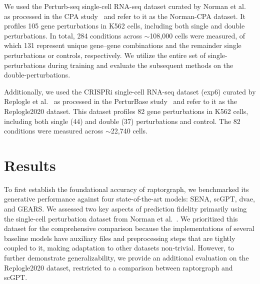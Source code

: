 \documentclass[10pt,letterpaper]{article}
\theoremstyle{definition}
\theoremstyle{remark}
\begin{document}
We used the Perturb-seq single-cell RNA-seq dataset curated by Norman et al.~\cite{norman2019exploring} as processed in the CPA study~\cite{lotfollahi_predicting_2023} and refer to it as the Norman-CPA dataset.
It profiles 105 gene perturbations in K562 cells, including both single and double perturbations.
In total, 284 conditions across $\sim$108{,}000 cells were measured, of which 131 represent unique gene--gene combinations and the remainder single perturbations or controls, respectively.
We utilize the entire set of single-perturbations during training and evaluate the subsequent methods on the double-perturbations.

Additionally, we used the CRISPRi single-cell RNA-seq dataset (exp6) curated by Replogle et al.~\cite{replogle_combinatorial_2020} as processed in the PerturBase study~\cite{wei_perturbase_2024} and refer to it as the Replogle2020 dataset.
This dataset profiles 82 gene perturbations in K562 cells, including both single (44) and double (37) perturbations and control.
The 82 conditions were measured across $\sim$22{,}740 cells.




\section*{Results}
To first establish the foundational accuracy of \gls{raptorgraph}, we benchmarked its generative performance against four state-of-the-art models: SENA, scGPT, \gls{dvae}, and GEARS.
We assessed two key aspects of prediction fidelity primarily using the single-cell perturbation dataset from Norman et al.~\cite{norman2019exploring}.
We prioritized this dataset for the comprehensive comparison because the implementations of several baseline models have auxiliary files and preprocessing steps that are tightly coupled to it, making adaptation to other datasets non-trivial.
However, to further demonstrate generalizability, we provide an additional evaluation on the Replogle2020 dataset, restricted to a comparison between \gls{raptorgraph} and scGPT.
\end{document}
